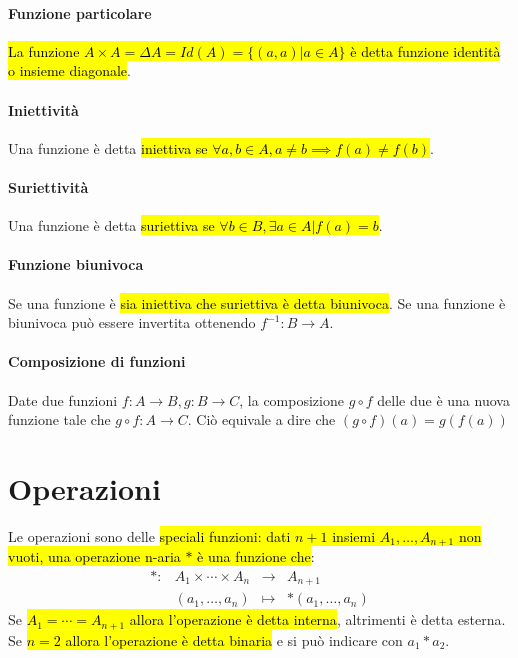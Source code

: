 \paragraph{Funzione particolare} \hl{La funzione
$A \times A = \Delta A = Id(A) = \{(a,a) | a \in A\}$ è detta funzione identità
o insieme diagonale}.

\paragraph{Iniettività} Una funzione è detta \hl{iniettiva se
$\forall a,b \in A, a \neq b \implies f(a) \neq f(b)$}.

\paragraph{Suriettività} Una funzione è detta \hl{suriettiva se
$\forall b \in B, \exists a \in A | f(a) = b$}.

\paragraph{Funzione biunivoca} Se una funzione è \hl{sia iniettiva che
suriettiva è detta biunivoca}. Se una funzione è biunivoca può essere invertita
ottenendo $f^{-1}: B \to A$.

\paragraph{Composizione di funzioni} Date due funzioni $f: A \to B, g: B \to C$,
la composizione $g \circ f$ delle due è una nuova funzione tale che
$g \circ f: A \to C$. Ciò equivale a dire che $(g \circ f)(a) = g(f(a))$

\section{Operazioni}
Le operazioni sono delle \hl{speciali funzioni: dati $n+1$ insiemi
$A_1, \dots, A_{n+1}$ non vuoti, una operazione n-aria $\ast$ è una funzione
che}:\[
    \begin{array}{cccc}
        \ast: &A_1 \times \cdots \times A_{n} &\to &A_{n+1} \\
        &(a_1, \dots, a_n) &\mapsto & \ast (a_1, \dots, a_n)
    \end{array}
\]
Se \hl{$A_1 = \cdots = A_{n+1}$ allora l'operazione è detta interna}, altrimenti
è detta esterna. Se \hl{$n = 2$ allora l'operazione è detta binaria} e si può
indicare con $a_1 \ast a_2$.

